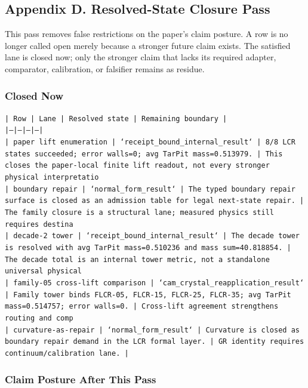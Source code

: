 \documentclass[11pt]{article}
\begin{document}
\subsection*{Appendix D. Resolved-State Closure Pass}

This pass removes false restrictions on the paper's claim posture. A row is no longer called open merely because a stronger future claim exists. The satisfied lane is closed now; only the stronger claim that lacks its required adapter, comparator, calibration, or falsifier remains as residue.

\subsubsection*{Closed Now}

\noindent\texttt{| Row | Lane | Resolved state | Remaining boundary |}\\
\noindent\texttt{|---|---|---|---|}\\
\noindent\texttt{| paper lift enumeration | `receipt\_bound\_internal\_result` | 8/8 LCR states succeeded; error walls=0; avg TarPit mass=0.513979. | This closes the paper-local finite lift readout, not every stronger physical interpretatio}\\
\noindent\texttt{| boundary repair | `normal\_form\_result` | The typed boundary repair surface is closed as an admission table for legal next-state repair. | The family closure is a structural lane; measured physics still requires destina}\\
\noindent\texttt{| decade-2 tower | `receipt\_bound\_internal\_result` | The decade tower is resolved with avg TarPit mass=0.510236 and mass sum=40.818854. | The decade total is an internal tower metric, not a standalone universal physical }\\
\noindent\texttt{| family-05 cross-lift comparison | `cam\_crystal\_reapplication\_result` | Family tower binds FLCR-05, FLCR-15, FLCR-25, FLCR-35; avg TarPit mass=0.514757; error walls=0. | Cross-lift agreement strengthens routing and comp}\\
\noindent\texttt{| curvature-as-repair | `normal\_form\_result` | Curvature is closed as boundary repair demand in the LCR formal layer. | GR identity requires continuum/calibration lane. |}\\

\subsubsection*{Claim Posture After This Pass}
\end{document}
